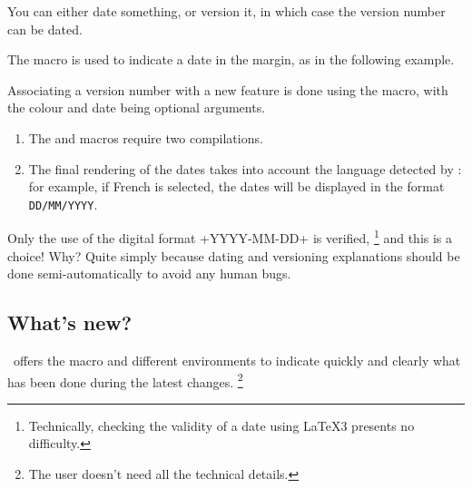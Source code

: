 You can either date something, or version it, in which case the version number can be dated.




\begin{tdocexa}
    The  macro is used to indicate a date in the margin, as in the following example.


\end{tdocexa}




\begin{tdocexa}
    Associating a version number with a new feature is done using the  macro, with the colour and date being optional arguments.


\end{tdocexa}


\begin{tdocimp}
    \begin{enumerate}[wide]
        \item The  and  macros require two compilations.

        \item The final rendering of the dates takes into account the language detected by \thisproj{}: for example, if French is selected, the dates will be displayed in the format \texttt{DD/MM/YYYY}.
    \end{enumerate}
\end{tdocimp}


\begin{tdocwarn}
    Only the use of the digital format \tdocinlatex+YYYY-MM-DD+ is verified,
    \footnote{
        Technically, checking the validity of a date using \LaTeX3 presents no difficulty.
    }
    and this is a choice! Why? Quite simply because dating and versioning explanations should be done semi-automatically to avoid any human bugs.
\end{tdocwarn}


\subsection{What's new?}

\thisproj\ offers the macro  and different environments to indicate quickly and clearly what has been done during the latest changes.%
\footnote{
    The user doesn't need all the technical details.
}



